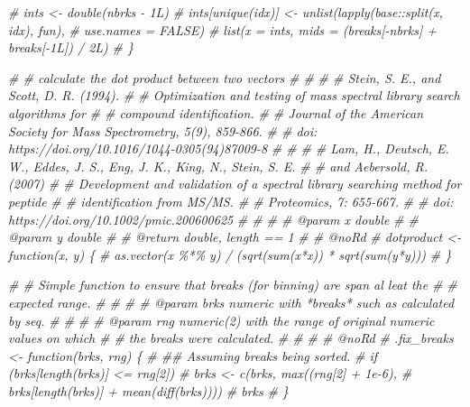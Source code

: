 \documentclass[
]{article}
\newenvironment{Shaded}{\begin{snugshade}}{\end{snugshade}}
\newcommand{\CommentTok}[1]{\textcolor[rgb]{0.56,0.35,0.01}{\textit{#1}}}
\begin{document}
\begin{Shaded}
\begin{Highlighting}[]
\CommentTok{\#     ints \textless{}{-} double(nbrks {-} 1L)}
\CommentTok{\#     ints[unique(idx)] \textless{}{-} unlist(lapply(base::split(x, idx), fun),}
\CommentTok{\#                                 use.names = FALSE)}
\CommentTok{\#     list(x = ints, mids = (breaks[{-}nbrks] + breaks[{-}1L]) / 2L)}
\CommentTok{\# \}}



\CommentTok{\# \#\textquotesingle{} calculate the dot product between two vectors}
\CommentTok{\# \#\textquotesingle{}}
\CommentTok{\# \#\textquotesingle{} Stein, S. E., and Scott, D. R. (1994).}
\CommentTok{\# \#\textquotesingle{} Optimization and testing of mass spectral library search algorithms for}
\CommentTok{\# \#\textquotesingle{} compound identification.}
\CommentTok{\# \#\textquotesingle{} Journal of the American Society for Mass Spectrometry, 5(9), 859{-}866.}
\CommentTok{\# \#\textquotesingle{} doi: https://doi.org/10.1016/1044{-}0305(94)87009{-}8}
\CommentTok{\# \#\textquotesingle{}}
\CommentTok{\# \#\textquotesingle{} Lam, H., Deutsch, E. W., Eddes, J. S., Eng, J. K., King, N., Stein, S. E.}
\CommentTok{\# \#\textquotesingle{} and Aebersold, R. (2007)}
\CommentTok{\# \#\textquotesingle{} Development and validation of a spectral library searching method for peptide}
\CommentTok{\# \#\textquotesingle{} identification from MS/MS.}
\CommentTok{\# \#\textquotesingle{} Proteomics, 7: 655{-}667.}
\CommentTok{\# \#\textquotesingle{} doi: https://doi.org/10.1002/pmic.200600625}
\CommentTok{\# \#\textquotesingle{}}
\CommentTok{\# \#\textquotesingle{} @param x double}
\CommentTok{\# \#\textquotesingle{} @param y double}
\CommentTok{\# \#\textquotesingle{} @return double, length == 1}
\CommentTok{\# \#\textquotesingle{} @noRd}
\CommentTok{\# dotproduct \textless{}{-} function(x, y) \{}
\CommentTok{\#   as.vector(x \%*\% y) / (sqrt(sum(x*x)) * sqrt(sum(y*y)))}
\CommentTok{\# \}}



\CommentTok{\# \#\textquotesingle{} Simple function to ensure that breaks (for binning) are span al leat the}
\CommentTok{\# \#\textquotesingle{} expected range.}
\CommentTok{\# \#\textquotesingle{}}
\CommentTok{\# \#\textquotesingle{} @param brks \textasciigrave{}numeric\textasciigrave{} with *breaks* such as calculated by \textasciigrave{}seq\textasciigrave{}.}
\CommentTok{\# \#\textquotesingle{}}
\CommentTok{\# \#\textquotesingle{} @param rng \textasciigrave{}numeric(2)\textasciigrave{} with the range of original numeric values on which}
\CommentTok{\# \#\textquotesingle{}     the breaks were calculated.}
\CommentTok{\# \#\textquotesingle{}}
\CommentTok{\# \#\textquotesingle{} @noRd}
\CommentTok{\# .fix\_breaks \textless{}{-} function(brks, rng) \{}
\CommentTok{\#     \#\# Assuming breaks being sorted.}
\CommentTok{\#     if (brks[length(brks)] \textless{}= rng[2])}
\CommentTok{\#         brks \textless{}{-} c(brks, max((rng[2] + 1e{-}6),}
\CommentTok{\#                             brks[length(brks)] + mean(diff(brks))))}
\CommentTok{\#     brks}
\CommentTok{\# \}}


\end{Highlighting}
\end{Shaded}
\end{document}
